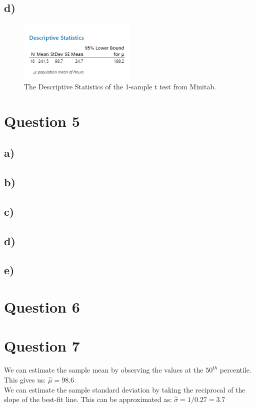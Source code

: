 \documentclass{article}
\begin{document}
\subsection*{d)}
\begin{figure}[h]
    \centering
    \includegraphics[width=0.5\textwidth]{./hw_1/images/4_a.png}
    \caption{The Descriptive Statistics of the 1-sample t test from Minitab.}
    \label{fig:4_b}
  \end{figure}



\section*{Question 5}

\subsection*{a)}
\subsection*{b)}
\subsection*{c)}
\subsection*{d)}
\subsection*{e)}

\section*{Question 6}

\section*{Question 7}
We can estimate the sample mean by observing the values at the $50^{th}$ percentile. This gives us:
$\stackrel{\sim}{\mu}= 98.6$\\
We can estimate the sample standard deviation by taking the reciprocal of the slope of the best-fit line.
This can be approximated as:
$\stackrel{\sim}{\sigma} = 1/0.27 = 3.7$\\
\end{document}

